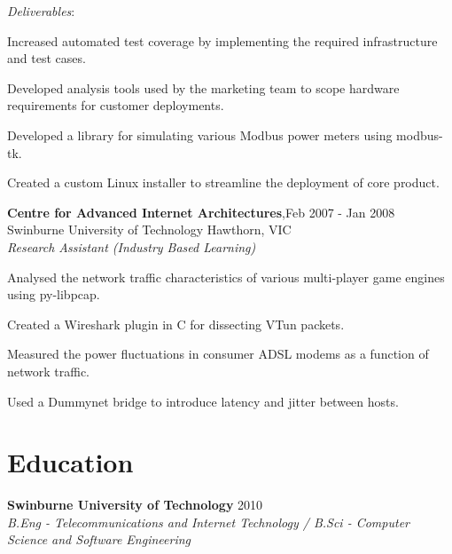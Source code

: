 \documentclass[line,margin]{res}
\begin{document}
\begin{resume}
        \textit{Deliverables}:
        \begin{list}{}{\leftmargin=1em \itemsep=-2pt}
            \item{Increased automated test coverage by implementing the required infrastructure and
                test cases.}
            \item{Developed analysis tools used by the marketing team to scope hardware
                requirements for customer deployments.}
            \item{Developed a library for simulating various Modbus power meters using modbus-tk.}
            \item{Created a custom Linux installer to streamline the deployment of core product.}
        \end{list}

        \textbf{Centre for Advanced Internet Architectures},\hfill Feb 2007 - Jan 2008 \\
        Swinburne University of Technology Hawthorn, VIC \\
        \textit{Research Assistant (Industry Based Learning)}\\

        \begin{list}{}{\leftmargin=1em \itemsep=-2pt}
            \item{Analysed the network traffic characteristics of various multi-player game engines using
            py-libpcap.}
            \item{Created a Wireshark plugin in C for dissecting VTun packets.}
            \item{Measured the power fluctuations in consumer ADSL modems as a function of network traffic.}
            \item{Used a Dummynet bridge to introduce latency and jitter between hosts.}
        \end{list}

        \section{Education}
        \textbf{Swinburne University of Technology} \hfill 2010\\
        \textit{B.Eng - Telecommunications and Internet Technology / B.Sci - Computer Science and
        Software Engineering}


\end{resume}
\end{document}
